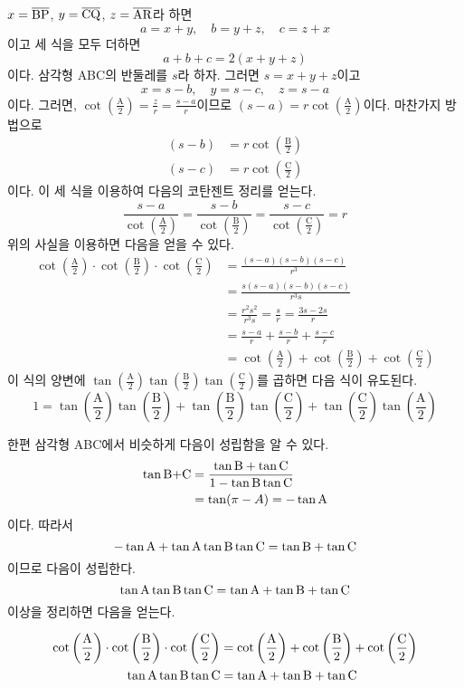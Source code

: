 \documentclass[11pt, a4paper]{book}
\begin{document}
$x=\overline{\textrm{BP}}$, $y=\overline{\textrm{CQ}}$, $z=\overline{\textrm{AR}}$라 하면
\[
a=x+y, \quad b=y+z, \quad c=z+x
\]
이고 세 식을 모두 더하면
\[
a+b+c = 2(x+y+z)
\]
이다. 삼각형 \textrm{ABC}의 반둘레를 $s$라 하자. 그러면 $s=x+y+z$이고
\[
x=s-b, \quad y=s-c, \quad z=s-a
\]
이다. 그러면, $\cot\left(\frac{\textrm{A}}{2}\right) = \frac{z}{r}=\frac{s-a}{r}$이므로 $(s-a)=r \cot\left(\frac{\textrm{A}}{2}\right)$이다. 마찬가지 방법으로
\begin{align*}
	(s-b) &=r \cot\left(\frac{\textrm{B}}{2}\right) \\
	(s-c) &=r \cot\left(\frac{\textrm{C}}{2}\right)
\end{align*}
이다. 이 세 식을 이용하여 다음의 코탄젠트 정리를 얻는다.
\[
\frac{s-a}{\cot\left(\frac{\textrm{A}}{2}\right)} = \frac{s-b}{\cot\left(\frac{\textrm{B}}{2}\right)} = \frac{s-c}{\cot\left(\frac{\textrm{C}}{2}\right)} =r
\]
 위의 사실을 이용하면 다음을 얻을 수 있다.
 \begin{align*}
 	\cot\left(\frac{\textrm{A}}{2}\right) \cdot \cot\left(\frac{\textrm{B}}{2}\right) \cdot \cot\left(\frac{\textrm{C}}{2}\right) &= \frac{(s-a)(s-b)(s-c)}{r^{3}} \\
 	&=\frac{s(s-a)(s-b)(s-c)}{r^{3}s} \\
 	&=\frac{r^{2}s^{2}}{r^{3}s} =\frac{s}{r}= \frac{3s-2s}{r} \\
 	&=\frac{s-a}{r} +\frac{s-b}{r} +\frac{s-c}{r}\\
 	&=\cot\left(\frac{\textrm{A}}{2}\right)+\cot\left(\frac{\textrm{B}}{2}\right)+\cot\left(\frac{\textrm{C}}{2}\right)
 \end{align*}
이 식의 양변에 $\tan\left(\frac{\textrm{A}}{2}\right)\tan\left(\frac{\textrm{B}}{2}\right)\tan\left(\frac{\textrm{C}}{2}\right)$를 곱하면 다음 식이 유도된다.
\begin{equation}\label{eqn:halftan}
1= \tan\left(\frac{\textrm{A}}{2}\right) \tan\left(\frac{\textrm{B}}{2}\right)+\tan\left(\frac{\textrm{B}}{2}\right) \tan\left(\frac{\textrm{C}}{2}\right)+\tan\left(\frac{\textrm{C}}{2}\right) \tan\left(\frac{\textrm{A}}{2}\right)
\end{equation}

한편 삼각형 \textrm{ABC}에서 비슷하게 다음이 성립함을 알 수 있다.
\begin{align*}
	\tan \textrm{B+C} &=\frac{\tan \textrm{B}+\tan \textrm{C}}{1-\tan \textrm{B}\tan \textrm{C}} \\
	&=\tan(\pi-A) =-\tan \textrm{A}
\end{align*}
이다. 따라서
\[
-\tan \textrm{A} + \tan \textrm{A} \tan \textrm{B} \tan \textrm{C} = \tan \textrm{B} +\tan \textrm{C}
\]
이므로 다음이 성립한다.
\[
 \tan \textrm{A} \tan \textrm{B} \tan \textrm{C} = \tan \textrm{A}+ \tan \textrm{B} +\tan \textrm{C}
\]
이상을 정리하면 다음을 얻는다.
\begin{theorem}[코탄젠트 정리]\vspace{-2em}
	\begin{align*}
		\cot\left(\frac{\textrm{A}}{2}\right) \cdot \cot\left(\frac{\textrm{B}}{2}\right) \cdot \cot\left(\frac{\textrm{C}}{2}\right)&= \cot\left(\frac{\textrm{A}}{2}\right)+\cot\left(\frac{\textrm{B}}{2}\right)+\cot\left(\frac{\textrm{C}}{2}\right)\\
		 \tan \textrm{A} \tan \textrm{B} \tan \textrm{C} &= \tan \textrm{A}+ \tan \textrm{B} +\tan \textrm{C}
	\end{align*}
\end{theorem}
\vspace{-2em}
\end{document}
